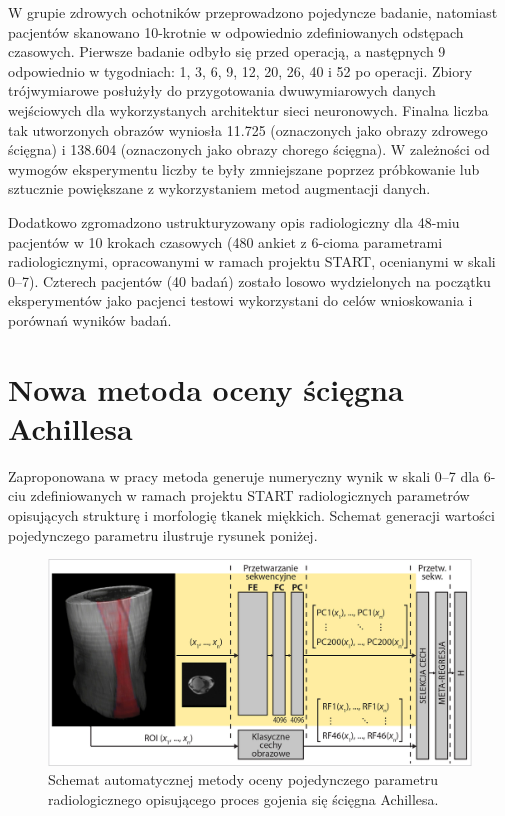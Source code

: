 W grupie zdrowych ochotników przeprowadzono pojedyncze badanie, natomiast pacjentów skanowano 10-krotnie w odpowiednio zdefiniowanych odstępach czasowych. Pierwsze badanie odbyło się przed operacją, a następnych 9 odpowiednio \linebreak w tygodniach: 1, 3, 6, 9, 12, 20, 26, 40 i 52 po operacji. Zbiory trójwymiarowe posłużyły do przygotowania dwuwymiarowych danych wejściowych dla wykorzystanych architektur sieci neuronowych. Finalna liczba tak utworzonych obrazów wyniosła 11.725 (oznaczonych jako obrazy zdrowego ścięgna) i 138.604 (oznaczonych jako obrazy chorego ścięgna). W zależności od wymogów eksperymentu liczby te były zmniejszane poprzez próbkowanie lub sztucznie powiększane z wykorzystaniem metod augmentacji danych.

Dodatkowo zgromadzono ustrukturyzowany opis radiologiczny dla 48-miu pacjentów w 10 krokach czasowych (480 ankiet z 6-cioma parametrami radiologicznymi, opracowanymi w ramach projektu START, ocenianymi w skali 0--7). Czterech pacjentów (40 badań) zostało losowo wydzielonych na początku eksperymentów jako pacjenci testowi wykorzystani do celów wnioskowania i porównań wyników badań.

{\let\clearpage\relax\chapter*{Nowa metoda oceny ścięgna Achillesa}}

Zaproponowana w pracy metoda generuje numeryczny wynik w skali 0--7 dla 6-ciu zdefiniowanych w ramach projektu START radiologicznych parametrów opisujących strukturę i morfologię tkanek miękkich. Schemat generacji wartości pojedynczego parametru ilustruje rysunek poniżej. 
\begin{figure}[h!]
	\includegraphics[width=\textwidth]{figures/net.jpg}
	\caption{Schemat automatycznej metody oceny pojedynczego parametru radiologicznego opisującego proces gojenia się ścięgna Achillesa.} \label{fig:net}
\end{figure}

